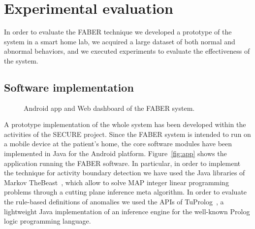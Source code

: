 \documentclass[10pt, conference, compsocconf]{IEEEtran}
\begin{document}
\section{Experimental evaluation}
\label{sec:experiments}
In order to evaluate the FABER technique we developed a prototype
of the system in a smart home lab, we acquired a large dataset of both normal and abnormal
behaviors, and we executed experiments to evaluate the effectiveness of the system.

\subsection{Software implementation}
\begin{figure*}[t!]
\centering
{}
\caption{Android app and Web dashboard of the FABER system.\label{fig:software}}
\end{figure*}
A prototype implementation of the whole system has been developed within the
activities of the SECURE project.
Since the FABER system is intended to run on a mobile device at the patient's
home, the core software modules have been implemented in Java for the Android
platform. Figure~\ref{fig:app} shows the application running the FABER
software. 
In particular, in order to implement the technique for activity boundary
detection we have used the Java libraries of Markov TheBeast~\cite{riedel2008}, 
which allow to solve MAP integer linear programming problems through 
a cutting plane inference meta algorithm.
In order to evaluate the rule-based definitions of anomalies we used the APIs
of TuProlog~\cite{tuprolog}, a lightweight Java implementation of an inference 
engine for the well-known Prolog logic programming language.
\end{document}
